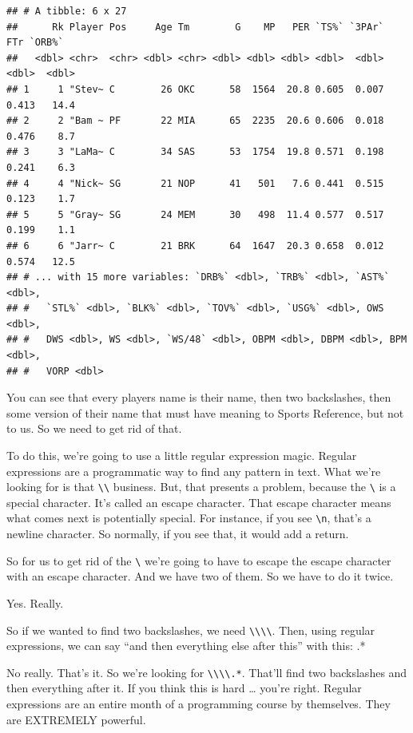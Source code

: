 \documentclass[
]{book}
\begin{document}
\begin{verbatim}
## # A tibble: 6 x 27
##      Rk Player Pos     Age Tm        G    MP   PER `TS%` `3PAr`   FTr `ORB%`
##   <dbl> <chr>  <chr> <dbl> <chr> <dbl> <dbl> <dbl> <dbl>  <dbl> <dbl>  <dbl>
## 1     1 "Stev~ C        26 OKC      58  1564  20.8 0.605  0.007 0.413   14.4
## 2     2 "Bam ~ PF       22 MIA      65  2235  20.6 0.606  0.018 0.476    8.7
## 3     3 "LaMa~ C        34 SAS      53  1754  19.8 0.571  0.198 0.241    6.3
## 4     4 "Nick~ SG       21 NOP      41   501   7.6 0.441  0.515 0.123    1.7
## 5     5 "Gray~ SG       24 MEM      30   498  11.4 0.577  0.517 0.199    1.1
## 6     6 "Jarr~ C        21 BRK      64  1647  20.3 0.658  0.012 0.574   12.5
## # ... with 15 more variables: `DRB%` <dbl>, `TRB%` <dbl>, `AST%` <dbl>,
## #   `STL%` <dbl>, `BLK%` <dbl>, `TOV%` <dbl>, `USG%` <dbl>, OWS <dbl>,
## #   DWS <dbl>, WS <dbl>, `WS/48` <dbl>, OBPM <dbl>, DBPM <dbl>, BPM <dbl>,
## #   VORP <dbl>
\end{verbatim}

You can see that every players name is their name, then two backslashes, then some version of their name that must have meaning to Sports Reference, but not to us. So we need to get rid of that.

To do this, we're going to use a little regular expression magic. Regular expressions are a programmatic way to find any pattern in text. What we're looking for is that \texttt{\textbackslash{}\textbackslash{}} business. But, that presents a problem, because the \texttt{\textbackslash{}} is a special character. It's called an escape character. That escape character means what comes next is potentially special. For instance, if you see \texttt{\textbackslash{}n}, that's a newline character. So normally, if you see that, it would add a return.

So for us to get rid of the \texttt{\textbackslash{}} we're going to have to escape the escape character with an escape character. And we have two of them. So we have to do it twice.

Yes. Really.

So if we wanted to find two backslashes, we need \texttt{\textbackslash{}\textbackslash{}\textbackslash{}\textbackslash{}}. Then, using regular expressions, we can say ``and then everything else after this'' with this: .*

No really. That's it. So we're looking for \texttt{\textbackslash{}\textbackslash{}\textbackslash{}\textbackslash{}.*}. That'll find two backslashes and then everything after it. If you think this is hard \ldots{} you're right. Regular expressions are an entire month of a programming course by themselves. They are EXTREMELY powerful.
\end{document}
